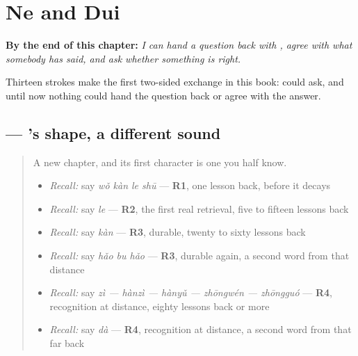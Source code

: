 
\chapter{Ne and Dui}
\label{ch:zh-ne-dui}

\begin{chapteropening}
\textbf{By the end of this chapter:} \emph{I can hand a question back with , agree with what somebody has said, and ask whether something is right.}

Thirteen strokes make the first two-sided exchange in this book:  could ask, and until now nothing could hand the question back or agree with the answer.
\end{chapteropening}

\section[\texorpdfstring{\zh{呢} (ne)}{呢 (ne)}]{ — 's shape, a different sound}

\label{lesson:ZH-W26-ne}



\begin{quote}
A new chapter, and its first character is one you half know.

\begin{itemize}
\raggedright
  \item \emph{Recall:} say \emph{wǒ kàn le shū} — \textbf{R1}, one lesson back, before it decays
  \item \emph{Recall:} say \emph{le} — \textbf{R2}, the first real retrieval, five to fifteen lessons back
  \item \emph{Recall:} say \emph{kàn} — \textbf{R3}, durable, twenty to sixty lessons back
  \item \emph{Recall:} say \emph{hǎo bu hǎo} — \textbf{R3}, durable again, a second word from that distance
  \item \emph{Recall:} say \emph{zì — hànzì — hànyǔ — zhōngwén — zhōngguó} — \textbf{R4}, recognition at distance, eighty lessons back or more
  \item \emph{Recall:} say \emph{dà} — \textbf{R4}, recognition at distance, a second word from that far back
\end{itemize}
\end{quote}

